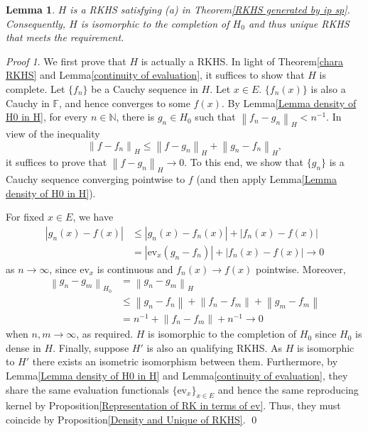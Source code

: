 \documentclass[a4paper,12pt]{article}
\newtheorem{lem}[thm]{Lemma}
\theoremstyle{remark}
\newtheorem*{prf}{Proof}
\theoremstyle{definition}
\theoremstyle{definition}
\theoremstyle{definition}
\newcommand{\abs}[1]{\left| #1 \right|}
\newcommand{\norm}[1]{\left\| #1 \right\|}
\newcommand{\ev}[1]{\mathrm{ev}_{#1}}
\begin{document}
\begin{lem}
	\( H \) is a RKHS satisfying (a) in Theorem\ref{RKHS generated by ip sp}. Consequently, \( H \) is isomorphic to the completion of \( H_0 \) and thus unique RKHS that meets the requirement.
\end{lem}
\begin{prf}
	We first prove that \( H \) is actually a RKHS. In light of Theorem\ref{chara RKHS} and Lemma\ref{continuity of evaluation}, it suffices to show that \( H \) is complete. Let \( \{f_n\} \) be a Cauchy sequence in \( H \). Let \( x \in E \). \( \{f_n(x)\} \) is also a Cauchy in \( \mathbb{F} \), and hence converges to some \( f(x) \). By Lemma\ref{Lemma density of H0 in H}, for every \( n \in \mathbb{N} \), there is \( g_n \in H_0 \) such that \( \norm{f_n-g_n}_H < n ^{-1}\). In view of the inequality
	\begin{equation*}
		\norm{f-f_n}_H \le \norm{f-g_n}_H + \norm{g_n- f_n}_H,
	\end{equation*}
	it suffices to prove that \( \norm{f-g_n}_H \to 0 \). To this end, we show that \( \{g_n\} \) is a Cauchy sequence converging pointwise to \( f \) (and then apply Lemma\ref{Lemma density of H0 in H}).

	For fixed \( x \in E \), we have
	\begin{equation*}
		\begin{aligned}
			\abs{g_n(x)-f(x)} & \le \abs{g_n(x)-f_n(x)} + \abs{f_n(x)-f(x)}       \\
			                  & = \abs{\ev{x}(g_n-f_n)} + \abs{f_n(x)-f(x)} \to 0
		\end{aligned}
	\end{equation*}
	as \( n \to \infty \), since \( \ev{x} \) is continuous and \( f_n(x)\to f(x) \) pointwise. Moreover,
	\begin{equation*}
		\begin{aligned}
			\norm{g_n-g_m}_{H_0} & = \norm{g_n-g_m}_{H}                                 \\
			                     & \le \norm{g_n-f_n} + \norm{f_n-f_m} + \norm{g_m-f_m} \\
			                     & = n ^{-1} + \norm{f_n-f_m} + n ^{-1} \to 0
		\end{aligned}
	\end{equation*}
	when \( n,m \to \infty \), as required. \( H \) is isomorphic to the completion of \( H_0 \) since \( H_0 \) is dense in \( H \). Finally, suppose \( H' \) is also an qualifying RKHS. As \( H \) is isomorphic to \( H' \) there exists an isometric isomorphism between them. Furthermore, by Lemma\ref{Lemma density of H0 in H} and Lemma\ref{continuity of evaluation}, they share the same evaluation functionals \( \{\ev{x} \} _{x \in E} \) and hence the same reproducing kernel by Proposition\ref{Representation of RK in terms of ev}. Thus, they must coincide by Proposition\ref{Density and Unique of RKHS}.
	\qed\end{prf}
\end{document}

